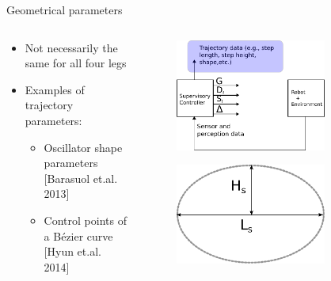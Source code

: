 \documentclass{beamer}
\begin{document}
\begin{frame}{Geometrical parameters}
		\begin{columns}
		\hspace{1cm}
		\begin{column}{0.5\textwidth}
		
		\begin{itemize}
			\setlength\itemsep{3em}
			\item Not necessarily the same for all four legs
			\item Examples of trajectory parameters:
			\begin{itemize}
			\item Oscillator shape parameters [Barasuol et.al. 2013]
			\item Control points of a Bézier curve [Hyun et.al. 2014]
			\end{itemize}
			
		
		\end{itemize}	
		
		\end{column}
		\begin{column}{0.5\textwidth}
			\begin{figure}[ht]\centering
				\includegraphics[width=0.75\textwidth]{images/Supervisory.pdf}
			\end{figure}
			\begin{figure}[ht]\centering
				\includegraphics[width=0.75\textwidth]{images/PrimitiveShape.pdf}
			\end{figure}	
		\end{column}
		\end{columns}
	\end{frame}
\end{document}
